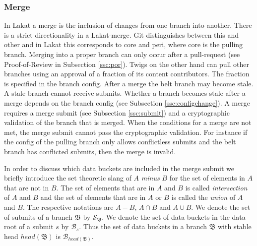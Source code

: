 \subsubsection*{Merge}
In Lakat a merge is the inclusion of changes from one branch into another. There is a strict directionality in a Lakat-merge. Git distinguishes between this and other and in Lakat this corresponds to core and peri, where core is the pulling branch. Merging into a proper branch can only occur after a pull-request (see Proof-of-Review in Subsection \ref{ssc:por}). Twigs on the other hand can pull other branches using an approval of a fraction of its content contributors. The fraction is specified in the branch config. After a merge the belt branch may become stale. A stale branch cannot receive submits. Whether a branch becomes stale after a merge depends on the branch config (see Subsection \ref{ssc:configchange}).
A merge requires a merge submit (see Subsection \ref{ssc:submit}) and a cryptographic validation of the branch that is merged. When the conditions for a merge are not met, the merge submit cannot pass the cryptographic validation. For instance if the config of the pulling branch only allows conflictless submits and the belt branch has conflicted submits, then the merge is invalid.

In order to discuss which data buckets are included in the merge submit we briefly introduce the set theoretic slang of $A$ \textit{minus} $B$ for the set of elements in $A$ that are not in $B$. The set of elements that are in $A$ and $B$ is called \textit{intersection} of $A$ and $B$ and the set of elements that are in $A$ or $B$ is called the \textit{union} of $A$ and $B$. The respective notations are $A-B$, $A\cap B$ and $A\cup B$. We denote the set of submits of a branch $\mathfrak B$ by $\mathcal S_{\mathfrak B}$. We denote the set of data buckets in the data root of a submit $s$ by $\mathcal{B}_s$. Thus the set of data buckets in a branch $\mathfrak B$ with stable head $head(\mathfrak B)$ is $\mathcal{B}_{head(\mathfrak B)}$. 

